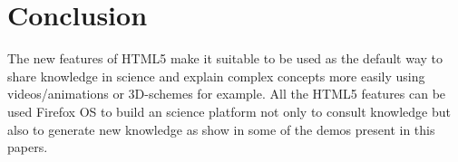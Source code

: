\section*{Conclusion}

The new features of HTML5 make it suitable to be used as the default way to
share knowledge in science and explain complex concepts more easily using
videos/animations or 3D-schemes for example. All the HTML5 features can be used
Firefox OS to build an science platform not only to consult knowledge but also
to generate new knowledge as show in some of the demos present in this papers.
